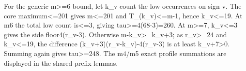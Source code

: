 \documentclass[10pt,a4paper]{article}
\theoremstyle{definition}
\begin{document}
For the generic m\textgreater=\allowbreak{}6 bound,\allowbreak{} let k\_\allowbreak{}v count the low
occurrences on sign v. The core maximum\textless=\allowbreak{}201 gives
m\textless=\allowbreak{}201 and T\_\allowbreak{}(k\_\allowbreak{}v)\textless=\allowbreak{}m-1,\allowbreak{} hence k\_\allowbreak{}v\textless=\allowbreak{}19. At m6
the total low count is\textless=\allowbreak{}3,\allowbreak{} giving tau\textgreater=\allowbreak{}4(68-3)=\allowbreak{}260.
At m\textgreater=\allowbreak{}7,\allowbreak{} k\_\allowbreak{}v\textless=\allowbreak{}3 gives the side floor4(r\_\allowbreak{}v-3).
Otherwise m-k\_\allowbreak{}v\textgreater=\allowbreak{}k\_\allowbreak{}v+\allowbreak{}3; as r\_\allowbreak{}v\textgreater=\allowbreak{}24 and
k\_\allowbreak{}v\textless=\allowbreak{}19,\allowbreak{} the difference (k\_\allowbreak{}v+\allowbreak{}3)(r\_\allowbreak{}v-k\_\allowbreak{}v)-4(r\_\allowbreak{}v-3) is at
least k\_\allowbreak{}v+\allowbreak{}7\textgreater0. Summing again gives tau\textgreater=\allowbreak{}248. The
m4/m5 exact profile summations are displayed in the shared prefix
lemmas.
\end{document}
